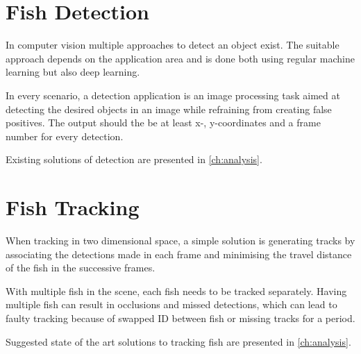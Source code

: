 \section{Fish Detection}
In computer vision multiple approaches to detect an object exist. The suitable approach depends on the application area and is done both using regular machine learning but also deep learning.

In every scenario, a detection application is an image processing task aimed at detecting the desired objects in an image while refraining from creating false positives. The output should the be at least x-, y-coordinates and a frame number for every detection.

Existing solutions of detection are presented in \autoref{ch:analysis}.

\section{Fish Tracking}
When tracking in two dimensional space, a simple solution is generating tracks by associating the detections made in each frame and minimising the travel distance of the fish in the successive frames.

With multiple fish in the scene, each fish needs to be tracked separately. Having multiple fish can result in occlusions and missed detections, which can lead to faulty tracking because of swapped ID between fish or missing tracks for a period.

Suggested state of the art solutions to tracking fish are presented in \autoref{ch:analysis}.